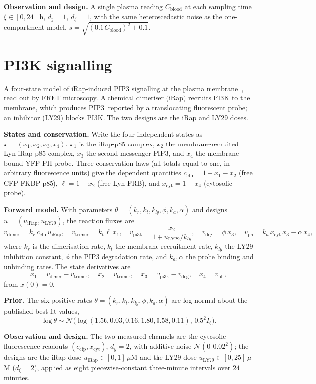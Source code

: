 \textbf{Observation and design.} A single plasma reading $C_{\mathrm{blood}}$ at each
sampling time $\xi\in[0,24]$\,h, $d_y=1$, $d_\xi=1$, with the same heteroscedastic noise
as the one-compartment model, $s=\sqrt{(0.1\,C_{\mathrm{blood}})^2+0.1}$.

\section{PI3K signalling}
A four-state model of iRap-induced PIP3 signalling at the plasma
membrane~\citep{liang2024structural}, read out by FRET microscopy. A chemical dimeriser
(iRap) recruits PI3K to the membrane, which produces PIP3, reported by a translocating
fluorescent probe; an inhibitor (LY29) blocks PI3K. The two designs are the iRap and LY29
doses.

\textbf{States and conservation.} Write the four independent states as
$x=(x_1,x_2,x_3,x_4)$: $x_1$ is the iRap-p85 complex, $x_2$ the membrane-recruited
Lyn-iRap-p85 complex, $x_3$ the second messenger PIP3, and $x_4$ the membrane-bound
YFP-PH probe. Three conservation laws (all totals equal to one, in arbitrary fluorescence
units) give the dependent quantities $c_{\mathrm{cfp}}=1-x_1-x_2$ (free CFP-FKBP-p85),
$\ell=1-x_2$ (free Lyn-FRB), and $x_{\mathrm{cyt}}=1-x_4$ (cytosolic probe).

\textbf{Forward model.} With parameters $\theta=(k_r,k_t,k_{ly},\phi,k_a,\alpha)$ and
designs $u=(u_{\mathrm{iRap}},u_{\mathrm{LY29}})$, the reaction fluxes are
\[
v_{\mathrm{dimer}}=k_r\,c_{\mathrm{cfp}}\,u_{\mathrm{iRap}},\quad
v_{\mathrm{trimer}}=k_t\,\ell\,x_1,\quad
v_{\mathrm{pi3k}}=\frac{x_2}{1+u_{\mathrm{LY29}}/k_{ly}},\quad
v_{\mathrm{deg}}=\phi\,x_3,\quad
v_{\mathrm{ph}}=k_a\,x_{\mathrm{cyt}}\,x_3-\alpha\,x_4,
\]
where $k_r$ is the dimerisation rate, $k_t$ the membrane-recruitment rate, $k_{ly}$ the
LY29 inhibition constant, $\phi$ the PIP3 degradation rate, and $k_a,\alpha$ the probe
binding and unbinding rates. The state derivatives are
\[
\dot x_1=v_{\mathrm{dimer}}-v_{\mathrm{trimer}},\quad
\dot x_2=v_{\mathrm{trimer}},\quad
\dot x_3=v_{\mathrm{pi3k}}-v_{\mathrm{deg}},\quad
\dot x_4=v_{\mathrm{ph}},
\]
from $x(0)=0$.

\textbf{Prior.} The six positive rates $\theta=(k_r,k_t,k_{ly},\phi,k_a,\alpha)$ are
log-normal about the published best-fit values,
\[
\log\theta\sim\mathcal N\big(\log(1.56,0.03,0.16,1.80,0.58,0.11),\,0.5^2 I_6\big).
\]

\textbf{Observation and design.} The two measured channels are the cytosolic fluorescence
readouts $(c_{\mathrm{cfp}},x_{\mathrm{cyt}})$, $d_y=2$, with additive noise
$\mathcal N(0,0.02^2)$; the designs are the iRap dose $u_{\mathrm{iRap}}\in[0,1]\,\mu$M
and the LY29 dose $u_{\mathrm{LY29}}\in[0,25]\,\mu$M ($d_\xi=2$), applied as eight
piecewise-constant three-minute intervals over $24$ minutes.

